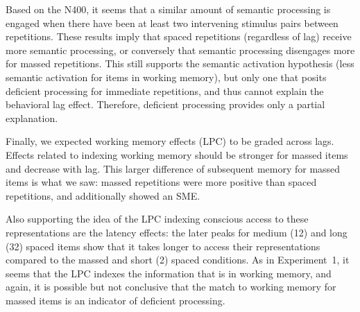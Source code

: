 Based on the N400, it seems that a similar amount of semantic processing is engaged when there have been at least two intervening stimulus pairs between repetitions.
These results imply that spaced repetitions (regardless of lag) receive more semantic processing, or conversely that semantic processing disengages more for massed repetitions.  This still supports the  semantic activation hypothesis (less semantic activation for items in working memory), but only one that posits deficient processing for immediate repetitions, and thus cannot explain the behavioral lag effect.
Therefore, deficient processing provides only a partial explanation.


Finally, we expected working memory effects (LPC) to be graded across lags.
Effects related to indexing working memory should be stronger for massed items and decrease with lag.  This larger difference of subsequent memory for massed items is what we saw: massed repetitions were more positive than spaced repetitions, and additionally showed an SME.

Also supporting the idea of the LPC indexing conscious access to these representations are the latency effects: the later peaks for medium (12) and long (32) spaced items show that it takes longer to access their representations compared to the massed and short (2) spaced conditions.
As in Experiment~1, it seems that the LPC indexes the information that is in working memory, and again, it is possible but not conclusive that the match to working memory for massed items is an indicator of deficient processing.


